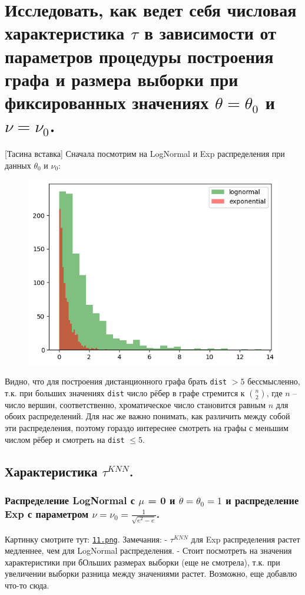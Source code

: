 \documentclass{report}
\begin{document}
\chapter{Исследовать, как ведет себя числовая характеристика $\tau$ в зависимости от параметров процедуры построения графа и размера выборки при фиксированных значениях $\theta = \theta_0$ и $\nu = \nu_0$.}
[Тасина вставка] Сначала посмотрим на LogNormal и Exp распределения при данных $\theta_0$ и $\nu_0$:
\begin{figure}[h]
    \centering
    \includegraphics[width=0.5\linewidth]{distributions.png}
\end{figure}
\newline
\newline
Видно, что для построения дистанционного графа брать \texttt{dist} $> 5$ бессмысленно, т.к. при больших значениях \texttt{dist} число рёбер в графе стремится к $\binom{n}{2}$, где $n$ -- число вершин, соответственно, хроматическое число становится равным $n$ для обоих распределений.
\newline
\newline
Для нас же важно понимать, как различить между собой эти распределения, поэтому гораздо интереснее смотреть на графы с меньшим числом рёбер и смотреть на \texttt{dist} $\leq 5$.

\section{Характеристика $\tau^{KNN}$.}
\subsection{Распределение LogNormal с $\mu$ = 0 и $\theta = \theta_0 = 1$ и распределение Exp с параметром $\nu = \nu_0 = \frac{1}{\sqrt{e^2 - e}}$.}
Картинку смотрите тут: \texttt{\href{https://github.com/misshimichka/dm-random-graphs/blob/report/report/11.png}{11.png}}.
\newline
\newline
Замечания:
\newline
\newline
- $\tau^{KNN}$ для Exp распределения растет медленнее, чем для LogNormal распределения.
\newline
\newline
- Стоит посмотреть на значения характеристики при бОльших размерах выборки (еще не смотрела), т.к. при увеличении выборки разница между значениями растет.
\newline
\newline
Возможно, еще добавлю что-то сюда.
\end{document}
